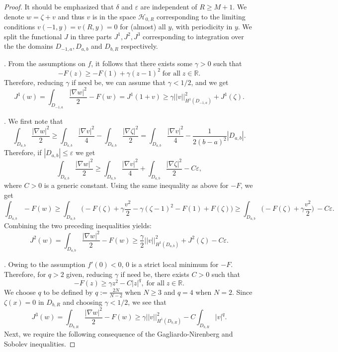 \documentclass[a4paper,12pt,fullpage]{article}
\numberwithin{equation}{section}
\def\R{{\mathbb R}}
\def\ep{\varepsilon}
\begin{document}
\begin{proof}
It should be emphasized that $\delta$ and $\ep$ are independent of $R\geq M+1$. We denote $w= \zeta + v$ and thus $v$ is in the space ${\mathcal H}_{0,R}$ corresponding to the limiting conditions $v(-1,y) = v(R,y) = 0$ for (almost) all $y$, with periodicity in $y$. We split the functional $J$ in three parts $J^1, J^2, J^3$ corresponding to integration over the  the domains $D_{-1,a}, D_{a,b}$ and $D_{b,R}$ respectively. 

\vskip 0.2cm
.
From the assumptions on $f$, it follows that there exists some $\gamma >0$ such that
\begin{equation*}
- F(z) \geq - F(1) +  \gamma (z-1)^2 \; \text{for all} \; z \in \R.
\end{equation*}
Therefore, reducing $\gamma$ if need be, we can assume that $\gamma < 1/2$, and we get
\begin{equation}\label{J1}
J^1(w)= \int_{D_{-1, a}} \frac{ |\nabla w |^2}{2} - F(w)= J^1( 1+ v) \geq \gamma ||v||_{H^1(D_{-1, a})}^2 + J^1(\zeta).
\end{equation}

\vskip 0.2cm
.
We first note that
\[
 \int_{D_{a, b}} \frac{ |\nabla w |^2}{2} \geq \int_{D_{a, b}} \frac{ |\nabla v |^2}{4}- \int_{D_{a, b}} \frac{ |\nabla \zeta |^2}{2} =\int_{D_{a, b}} \frac{ |\nabla v |^2}{4}- \frac{1}{2(b-a)^{2} }|D_{a, b}|.
\]
Therefore, if $|D_{a,b}| \leq \ep$ we get
\[
\int_{D_{a, b}} \frac{ |\nabla w |^2}{2} \geq \int_{D_{a, b}} \frac{ |\nabla v |^2}{4}+ \int_{D_{a, b}} \frac{ |\nabla \zeta |^2}{2}- C \ep,
\] 
where $C>0$ is a generic constant. Using the same inequality as above for $-F$, we get
\[
\int_{D_{a,b}}\!\!\!\!\!-F(w) \geq \int_{D_{a,b}}\!\!\!\Big(- F(\zeta) + \gamma \frac{v^2}{2} - \gamma (\zeta -1)^2 - F(1) + F(\zeta)\Big)\geq \int_{D_{a,b}}\!\!\!\Big(- F(\zeta) + \gamma \frac{v^2}{2}\Big)\ - C \ep.
\]
Combining the two preceding inequalities yields:
\begin{equation}\label{J2}
J^2(w)= \int_{D_{a, b}} \frac{ |\nabla w |^2}{2} - F(w)\geq \frac{\gamma}{2} ||v||_{H^1(D_{a, b})}^2 + J^2(\zeta) -C \ep.
\end{equation}

\vskip 0.2cm
. Owing to the assumption $f'(0) <0$, $0$ is a strict local minimum for $-F$. Therefore, for $q>2$ given, reducing $\gamma$ if need be, there exists $C>0$ such that
\[
-F(z) \geq \gamma z^2 - C |z|^q, \; \text{for all} \; z\in\R.
\]
We choose $q$ to be defined by $q := \frac{2N}{N-2}$ when $N\geq 3$ and $q=4$ when $N=2$. Since $\zeta(x)=0$ in $D_{b, R}$ and choosing $\gamma < 1/2$, we see that
\[
J^3(w) = \int_{D_{b, R}} \frac{ |\nabla w |^2}{2} - F(w) \geq    \gamma||v||_{H^1(D_{b, R})}^2- C \int_{D_{b, R}}   |v|^q.
\]
Next, we require the following consequence of the Gagliardo-Nirenberg and Sobolev inequalities.


\end{proof}
\end{document}
